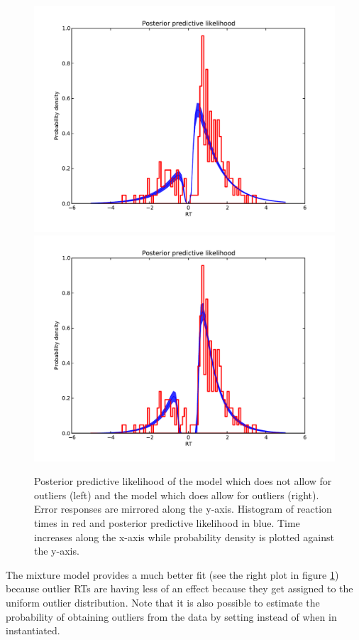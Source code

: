 \documentclass[letterpaper,10pt,english]{article}
\begin{document}
\begin{figure}
\includegraphics[width=0.5\columnwidth]{hddm_demo_fig_10.pdf}
\includegraphics[width=0.5\columnwidth]{hddm_demo_fig_11.pdf}
\caption{Posterior predictive likelihood of the model which does not allow for outliers (left) and the model which does allow for outliers (right). Error responses are mirrored along the y-axis. Histogram of reaction times in red and posterior predictive likelihood in blue. Time increases along the x-axis while probability density is plotted against the y-axis. }
\label{fig.outliers}
\end{figure}


The mixture model provides a much better fit (see the right plot in figure \ref{fig.outliers}) because outlier RTs are having less of an effect because they get assigned to the uniform outlier distribution. Note that it is also possible to estimate the probability of obtaining outliers from the data by setting  instead of  when  in instantiated.
\end{document}
